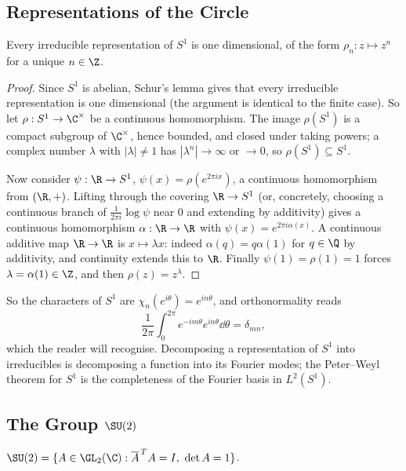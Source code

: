 \subsection{Representations of the Circle}

\begin{theorem}
	Every irreducible representation of $S^1$ is one dimensional, of the form $\rho_n : z\mapsto z^n$ for a unique $n\in\Z$.
\end{theorem}
\begin{proof}
	Since $S^1$ is abelian, Schur's lemma gives that every irreducible representation is one dimensional (the argument is identical to the finite case). So let $\rho : S^1\to\C^\times$ be a continuous homomorphism. The image $\rho(S^1)$ is a compact subgroup of $\C^\times$, hence bounded, and closed under taking powers; a complex number $\lambda$ with $|\lambda|\neq1$ has $|\lambda^n|\to\infty$ or $\to0$, so $\rho(S^1)\subseteq S^1$.

	Now consider $\psi : \R\to S^1$, $\psi(x) = \rho(e^{2\pi i x})$, a continuous homomorphism from $(\R,+)$. Lifting through the covering $\R\to S^1$ (or, concretely, choosing a continuous branch of $\frac{1}{2\pi i}\log\psi$ near $0$ and extending by additivity) gives a continuous homomorphism $\alpha : \R\to\R$ with $\psi(x) = e^{2\pi i\alpha(x)}$. A continuous additive map $\R\to\R$ is $x\mapsto\lambda x$: indeed $\alpha(q) = q\alpha(1)$ for $q\in\Q$ by additivity, and continuity extends this to $\R$. Finally $\psi(1) = \rho(1) = 1$ forces $\lambda = \alpha(1)\in\Z$, and then $\rho(z) = z^\lambda$.
\end{proof}

So the characters of $S^1$ are $\chi_n(e^{i\theta}) = e^{in\theta}$, and orthonormality reads
$$\frac1{2\pi}\int_0^{2\pi}e^{-im\theta}e^{in\theta}\dd\theta = \delta_{mn},$$
which the reader will recognise. Decomposing a representation of $S^1$ into irreducibles is decomposing a function into its Fourier modes; the Peter--Weyl theorem for $S^1$ is the completeness of the Fourier basis in $L^2(S^1)$.

\subsection{The Group \texorpdfstring{$\SU(2)$}{SU(2)}}

\begin{definition}
	$\SU(2) = \{A\in\GL_2(\C) : \overline A^{\,T}A = I,\ \det A = 1\}$.
\end{definition}

